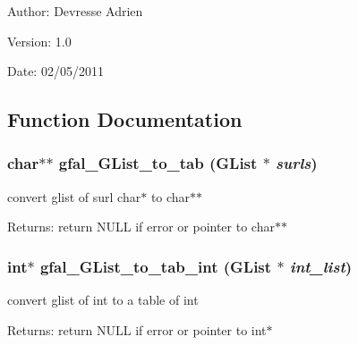 \begin{Desc}
\item[Author:]Devresse Adrien \end{Desc}
\begin{Desc}
\item[Version:]1.0 \end{Desc}
\begin{Desc}
\item[Date:]02/05/2011 \end{Desc}


\subsection{Function Documentation}
\subsubsection{\setlength{\rightskip}{0pt plus 5cm}char$\ast$$\ast$ gfal\_\-GList\_\-to\_\-tab (GList $\ast$ {\em surls})}\label{gfal__common__all_8c_a7e1120eb32c4c7f293f6fbcb4f0ea33}


convert glist of surl char$\ast$ to char$\ast$$\ast$ 

\begin{Desc}
\item[Returns:]return NULL if error or pointer to char$\ast$$\ast$ \end{Desc}
\subsubsection{\setlength{\rightskip}{0pt plus 5cm}int$\ast$ gfal\_\-GList\_\-to\_\-tab\_\-int (GList $\ast$ {\em int\_\-list})}\label{gfal__common__all_8c_87219c9e2c6323b67c2ac70354ee2645}


convert glist of int to a table of int 

\begin{Desc}
\item[Returns:]return NULL if error or pointer to int$\ast$ \end{Desc}

